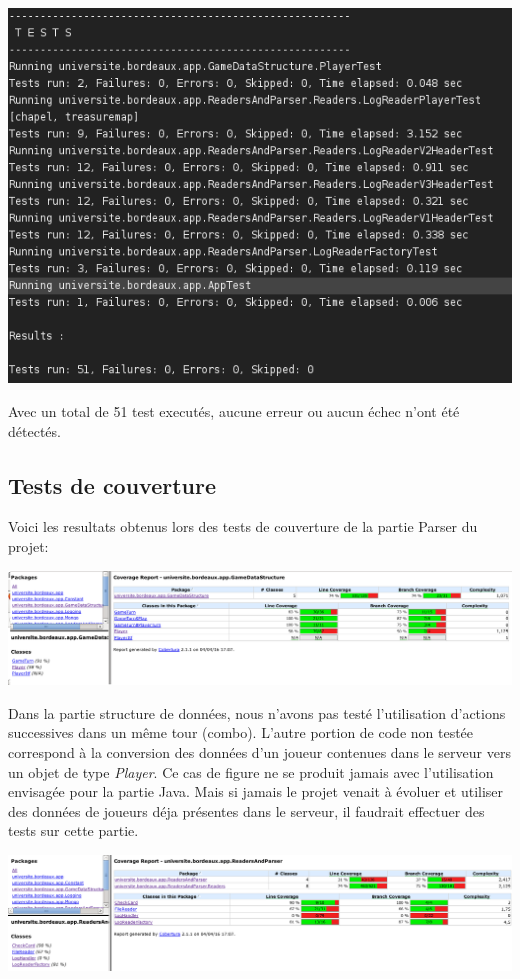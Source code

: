 \includegraphics[width=\textwidth,height=\textheight,keepaspectratio]{./unit_tests_jave}

Avec un total de 51 test executés, aucune erreur ou aucun échec n'ont été détectés.

\subsection{Tests de couverture}
Voici les resultats obtenus lors des tests de couverture de la partie Parser du projet:

\includegraphics[width=\textwidth,height=\textheight,keepaspectratio]{./coverage_GameDataStructure}

Dans la partie structure de données, nous n'avons pas testé l'utilisation d'actions successives dans un même tour (combo). L'autre portion de code non testée correspond à la conversion des données d'un joueur contenues dans le serveur vers un objet de type \textit{Player}. Ce cas de figure ne se produit jamais avec l'utilisation envisagée pour la partie Java. Mais si jamais le projet venait à évoluer et utiliser des données de joueurs déja présentes dans le serveur, il faudrait effectuer des tests sur cette partie.

\includegraphics[width=\textwidth,height=\textheight,keepaspectratio]{./coverage_ReadersAndParser}

